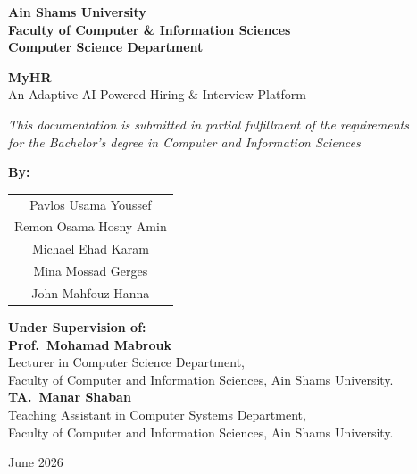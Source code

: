 \documentclass[12pt,a4paper,oneside]{report}
\begin{document}
\pagestyle{empty}

\begin{titlepage}
\begin{center}
  \vspace*{0.5cm}


  \vspace{0.6cm}
  {\large\textbf{Ain Shams University}}\\[2pt]
  {\large\textbf{Faculty of Computer \& Information Sciences}}\\[2pt]
  {\large\textbf{Computer Science Department}}

  \vspace{2.5cm}
  {\Huge\bfseries MyHR}\\[8pt]
  {\Large An Adaptive AI-Powered Hiring \& Interview Platform}

  \vspace{2cm}
  \textit{This documentation is submitted in partial fulfillment of the requirements\\
  for the Bachelor's degree in Computer and Information Sciences}

  \vspace{2cm}
  {\large\textbf{By:}}\\[10pt]
  \begin{tabular}{c}
    Pavlos Usama Youssef \\[4pt]
    Remon Osama Hosny Amin \\[4pt]
    Michael Ehad Karam \\[4pt]
    Mina Mossad Gerges \\[4pt]
    John Mahfouz Hanna 
  \end{tabular}

  \vspace{1.8cm}
  {\large\textbf{Under Supervision of:}}\\[12pt]
  \textbf{Prof.\ Mohamad Mabrouk}\\
  {\small Lecturer in Computer Science Department,\\
  Faculty of Computer and Information Sciences, Ain Shams University.}\\[14pt]
  \textbf{TA.\ Manar Shaban}\\
  {\small Teaching Assistant in Computer Systems Department,\\
  Faculty of Computer and Information Sciences, Ain Shams University.}

  \vfill
  {\large June 2026}
\end{center}
\end{titlepage}
\end{document}
